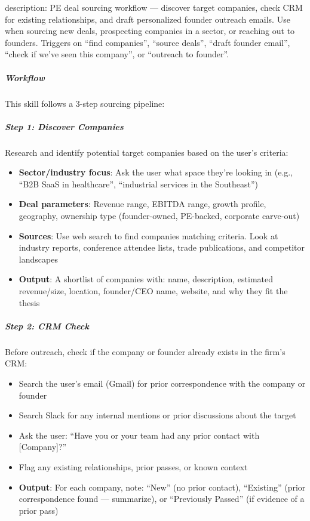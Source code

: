 \documentclass[11pt]{article}
\begin{document}
description: PE deal sourcing workflow — discover target companies, check CRM for existing relationships, and draft personalized founder outreach emails. Use when sourcing new deals, prospecting companies in a sector, or reaching out to founders. Triggers on ``find companies'', ``source deals'', ``draft founder email'', ``check if we've seen this company'', or ``outreach to founder''.


\subparagraph{Workflow}\mbox{}\par

This skill follows a 3-step sourcing pipeline:


\subparagraph{Step 1: Discover Companies}\mbox{}\par

Research and identify potential target companies based on the user's criteria:


\begin{itemize}[leftmargin=*,itemsep=2pt,topsep=2pt]
\item {} \textbf{Sector/industry focus}: Ask the user what space they're looking in (e.g., ``B2B SaaS in healthcare'', ``industrial services in the Southeast'')
\item {} \textbf{Deal parameters}: Revenue range, EBITDA range, growth profile, geography, ownership type (founder-owned, PE-backed, corporate carve-out)
\item {} \textbf{Sources}: Use web search to find companies matching criteria. Look at industry reports, conference attendee lists, trade publications, and competitor landscapes
\item {} \textbf{Output}: A shortlist of companies with: name, description, estimated revenue/size, location, founder/CEO name, website, and why they fit the thesis
\end{itemize}

\subparagraph{Step 2: CRM Check}\mbox{}\par

Before outreach, check if the company or founder already exists in the firm's CRM:


\begin{itemize}[leftmargin=*,itemsep=2pt,topsep=2pt]
\item {} Search the user's email (Gmail) for prior correspondence with the company or founder
\item {} Search Slack for any internal mentions or prior discussions about the target
\item {} Ask the user: ``Have you or your team had any prior contact with [Company]?''
\item {} Flag any existing relationships, prior passes, or known context
\item {} \textbf{Output}: For each company, note: ``New'' (no prior contact), ``Existing'' (prior correspondence found — summarize), or ``Previously Passed'' (if evidence of a prior pass)
\end{itemize}
\end{document}
